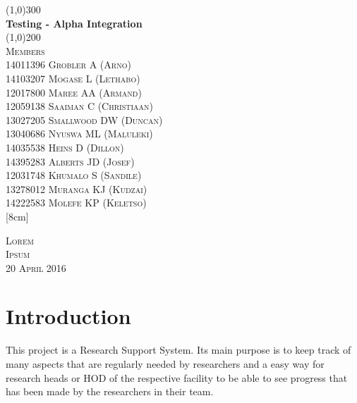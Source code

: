 \documentclass{article}
\begin{document}
\begin{titlepage}
    \begin{center}
        \line(1,0){300}\\
        [6mm]
        \huge{\bfseries Testing - Alpha Integration}\\
        [2mm]
        \line(1,0){200}\\
        [15mm]
        \textsc{\large Members}\\
        [7.5mm]
        \textsc{
                \large14011396  Grobler A (Arno) \\
                14103207    Mogase  L (Lethabo)\\
                12017800    Maree   AA (Armand)\\
                12059138    Saaiman C (Christiaan)\\
                13027205    Smallwood   DW (Duncan)\\
                13040686    Nyuswa  ML (Maluleki)\\
                14035538    Heins   D (Dillon)\\
                14395283    Alberts JD (Josef)\\
                12031748    Khumalo S (Sandile)\\
                13278012    Muranga KJ (Kudzai)\\
                14222583    Molefe  KP (Keletso)\\
            }
        [8cm]
    \end{center}
    
    \begin{flushright}
        \textsc{\large Lorem\\
        Ipsum\\
        20 April 2016\\}
    \end{flushright}
\end{titlepage}

\tableofcontents
\thispagestyle{empty}
\cleardoublepage
%

\setcounter{page}{1}
%

\section{Introduction}\label{sec:intro}
    This project is a Research Support System. Its main purpose is to keep track of many aspects that are regularly needed by researchers and a easy way for research heads or HOD of the respective facility to be able to see progress that has been made by the researchers in their team.
    
\end{document}
